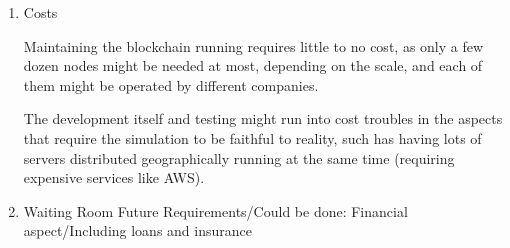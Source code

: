 \begin{enumerate}
    \item Costs
		\par Maintaining the blockchain running requires little to no cost, as only a few dozen nodes might be needed at most, depending on the scale, and each of them might be operated by different companies.
		\par The development itself and testing might run into cost troubles in the aspects that require the simulation to be faithful to reality, such has having lots of servers distributed geographically running at the same time (requiring expensive services like AWS).
    \item Waiting Room Future Requirements/Could be done: Financial aspect/Including loans and insurance

\end{enumerate}